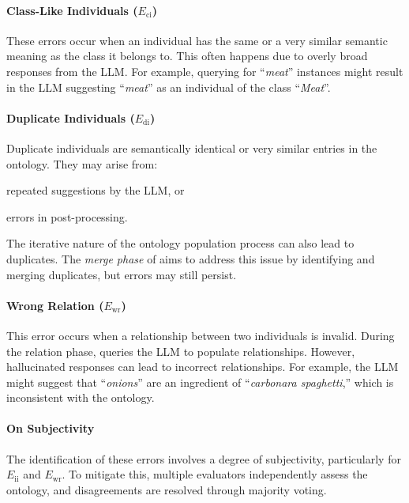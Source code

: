 %
\paragraph{Class-Like Individuals (\(E_{\text{ci}}\))}

These errors occur when an individual has the same or a very similar semantic meaning as the class it belongs to.
%
This often happens due to overly broad responses from the \gls{LLM}.
%
For example, querying for ``\emph{meat}'' instances might result in the \gls{LLM} suggesting ``\emph{meat}'' as an individual of the class ``\emph{Meat}''.

%
\paragraph{Duplicate Individuals (\(E_{\text{di}}\))}

Duplicate individuals are semantically identical or very similar entries in the ontology.
%
They may arise from:
%
\begin{inlinelist}
    \item repeated suggestions by the \gls{LLM}, or
    \item errors in post-processing.
\end{inlinelist}
%
The iterative nature of the ontology population process can also lead to duplicates.
%
The \emph{merge phase} of \llmfkg{} aims to address this issue by identifying and merging duplicates, but errors may still persist.

%
\paragraph{Wrong Relation (\(E_{\text{wr}}\))}

This error occurs when a relationship between two individuals is invalid.
%
During the relation phase, \llmfkg{} queries the \gls{LLM} to populate relationships.
%
However, hallucinated responses can lead to incorrect relationships.
%
For example, the \gls{LLM} might suggest that ``\emph{onions}'' are an ingredient of ``\emph{carbonara spaghetti},'' which is inconsistent with the ontology.

%
\paragraph*{On Subjectivity}

The identification of these errors involves a degree of subjectivity, particularly for \(E_{\text{ii}}\) and \(E_{\text{wr}}\).
%
To mitigate this, multiple evaluators independently assess the ontology, and disagreements are resolved through majority voting.

